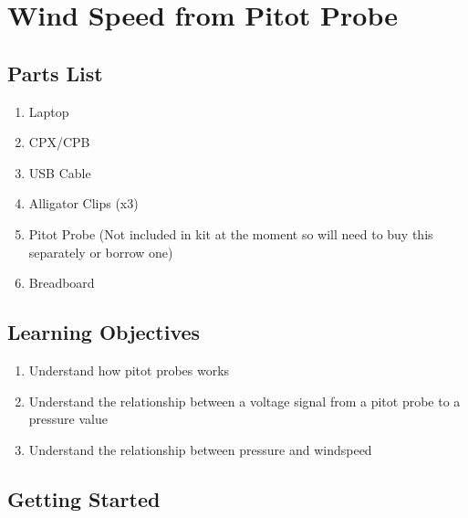 \newpage

\section{Wind Speed from Pitot Probe}

\subsection{Parts List}

\begin{enumerate}[itemsep=-5pt]
\item Laptop
\item CPX/CPB
\item USB Cable
\item Alligator Clips (x3)
\item Pitot Probe (Not included in kit at the moment so will need to buy this separately or borrow one)
\item Breadboard
\end{enumerate}

\subsection{Learning Objectives}
\begin{enumerate}[itemsep=-5pt]
\item Understand how pitot probes works
\item Understand the relationship between a voltage signal from a pitot probe to a pressure value
\item Understand the relationship between pressure and windspeed
\end{enumerate}

\subsection{Getting Started}

